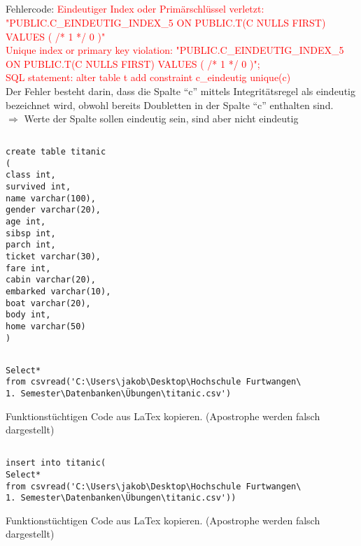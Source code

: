 \documentclass[a4paper,11pt,titlepage]{article}
\begin{document}
\subsection{}
Fehlercode: \textcolor{red}{Eindeutiger Index oder Primärschlüssel verletzt: "PUBLIC.C\_EINDEUTIG\_INDEX\_5 ON PUBLIC.T(C NULLS FIRST) VALUES ( /* 1 */ 0 )"\\
Unique index or primary key violation: "PUBLIC.C\_EINDEUTIG\_INDEX\_5 ON PUBLIC.T(C NULLS FIRST) VALUES ( /* 1 */ 0 )";\\ SQL statement: alter table t add constraint c\_eindeutig unique(c)}\\
Der Fehler besteht darin, dass die Spalte "`c"' mittels Integritätsregel als eindeutig bezeichnet wird, obwohl bereits Doubletten in der Spalte "`c"' enthalten sind.\\
 $\Rightarrow$ Werte der Spalte sollen eindeutig sein, sind aber nicht eindeutig
\newpage
\subsection{}
\begin{verbatim}
create table titanic
(
class int,
survived int,
name varchar(100),
gender varchar(20),
age int,
sibsp int,
parch int,
ticket varchar(30),
fare int,
cabin varchar(20),
embarked varchar(10),
boat varchar(20),
body int,
home varchar(50)
)
\end{verbatim}
\subsection{}
\begin{verbatim}
Select*
from csvread('C:\Users\jakob\Desktop\Hochschule Furtwangen\
1. Semester\Datenbanken\Übungen\titanic.csv')
\end{verbatim}
Funktionstüchtigen Code aus LaTex kopieren. (Apostrophe werden falsch dargestellt)
\subsection{}
\begin{verbatim}
insert into titanic(
Select*
from csvread('C:\Users\jakob\Desktop\Hochschule Furtwangen\
1. Semester\Datenbanken\Übungen\titanic.csv'))
\end{verbatim}
Funktionstüchtigen Code aus LaTex kopieren. (Apostrophe werden falsch dargestellt)
\end{document}

